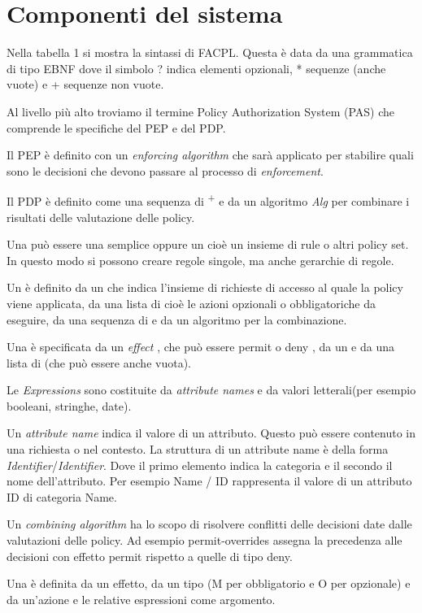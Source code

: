 \section{Componenti del sistema}
\label{sub:Componenti del sistema}

Nella tabella 1 si mostra la sintassi di FACPL. Questa è data da una grammatica di tipo EBNF dove il simbolo ? indica
elementi opzionali, * sequenze (anche vuote) e + sequenze non vuote.\par
Al livello più alto troviamo il termine Policy Authorization System (PAS) che comprende le specifiche del PEP e del PDP.\par
Il PEP è definito con un \emph{enforcing algorithm} che sarà applicato per stabilire quali sono le decisioni che devono
passare al processo di \emph{enforcement}.\par
Il PDP è definito come una sequenza di
\textsuperscript{+} e da un algoritmo \emph{Alg} per combinare i
risultati delle valutazione delle policy.\par

Una \ePolicy può essere una \eRule semplice oppure un \ePolicySet cioè un insieme di rule o altri
policy set. In questo modo si possono creare regole singole, ma anche gerarchie di regole.\par
Un \ePolicySet è definito da un \etarget che indica l'insieme di richieste di accesso al quale la policy
viene applicata, da una lista di \eObligations cioè le azioni opzionali o obbligatoriche da eseguire, da una
sequenza di \ePolicy e da un algoritmo per la combinazione.\par
Una \eRule  è specificata da un \emph{effect} , che può essere permit o deny , da un \etarget
e da una lista di \eObligations(che può essere anche vuota). \par
Le \emph{Expressions} sono costituite da \emph{attribute names} e da valori letterali(per esempio booleani, stringhe, date).\par
Un \emph{attribute name} indica il valore di un attributo. Questo può essere contenuto in una richiesta o nel contesto. La
struttura di un attribute name è della forma \emph{Identifier}/\emph{Identifier}. Dove il primo elemento indica la categoria
e il secondo il nome dell'attributo. Per esempio Name / ID rappresenta il valore di un attributo ID di categoria Name.\par
Un \emph{combining algorithm} ha lo scopo di risolvere conflitti delle decisioni date dalle valutazioni delle policy.
Ad esempio permit-overrides assegna la precedenza alle decisioni con effetto permit rispetto a quelle di tipo deny.\par
Una \eObligation è definita da un effetto, da un tipo (M per obbligatorio e O per opzionale) e da un'azione e le relative
espressioni come argomento.\par

